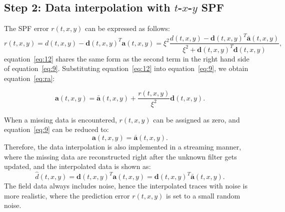 \subsection{Step 2: Data interpolation with $t$-$x$-$y$ SPF}

The SPF error $r(t,x,y)$ can be expressed as follows:
\begin{equation}
 \label{eq:12}
 r(t,x,y)=d(t,x,y)-\mathbf{d}(t,x,y)^{T}\mathbf{a}(t,x,y)=\xi^2\frac{
  d(t,x,y)-\mathbf{d}(t,x,y)^T\mathbf{\bar{a}}(t,x,y)}
  {
  \xi^2+\mathbf{d}(t,x,y)^T\mathbf{d}(t,x,y)},
\end{equation}
equation~\ref{eq:12} shares the same form as the second term in the
right hand side of equation~\ref{eq:9}.
Substituting equation~\ref{eq:12} into equation~\ref{eq:9}, 
we obtain equation~\ref{eq:ra}:

\begin{equation}
 \label{eq:ra}
 \mathbf{a}(t,x,y)=\mathbf{\bar{a}}(t,x,y)+\frac{r(t,x,y)}{\xi^2}\mathbf{d}(t,x,y).
\end{equation}

When a missing data is encountered, $r(t,x,y)$ can be assigned as
zero, and equation~\ref{eq:9} can be reduced to:
\begin{equation}
 \label{eq:13}
 \mathbf{a}(t,x,y)= \mathbf{\bar{a}}(t,x,y).
\end{equation}
Therefore, the data interpolation is also implemented in a streaming
manner, where the missing data are reconstructed right after the
unknown filter gets updated, and the interpolated data is shown as:
\begin{equation}
 \label{eq:14}
 \widehat{d}(t,x,y)=\mathbf{d}(t,x,y)^{T}\mathbf{a}(t,x,y)=\mathbf{d}(t,x,y)^{T} \mathbf{\bar{a}}(t,x,y).
\end{equation}
The field data always includes noise, hence the interpolated traces
with noise is more realistic, where the prediction error $r(t,x,y)$ is
set to a small random noise.

